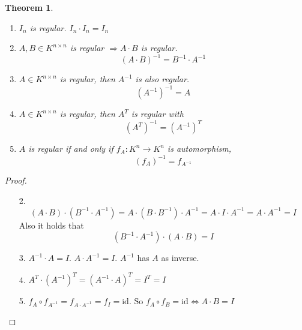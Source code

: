 \documentclass[a4paper,landscape,twocolumn]{article}
\newtheorem{theorem}{Theorem}
\begin{document}
\begin{theorem}
  \label{theorem-6.14}
  \begin{enumerate}
    \item $I_n$ is regular. $I_n \cdot I_n = I_n$
    \item $A, B \in K^{n\times n}$ is regular $\Rightarrow A \cdot B$ is regular.
      \[ \left(A \cdot B\right)^{-1} = B^{-1} \cdot A^{-1} \]
    \item $A \in K^{n\times n}$ is regular, then $A^{-1}$ is also regular.
      \[ \left(A^{-1}\right)^{-1} = A \]
    \item $A \in K^{n\times n}$ is regular, then $A^T$ is regular with
      \[ \left(A^T\right)^{-1} = \left(A^{-1}\right)^T \]
    \item $A$ is regular if and only if $f_A: K^n \to K^n$ is automorphism,
      \[ \left(f_A\right)^{-1} = f_{A^{-1}} \]
  \end{enumerate}
\end{theorem}
\begin{proof}
  \begin{enumerate}
    \item[2.] \[
        (A \cdot B) \cdot (B^{-1} \cdot A^{-1})
        = A \cdot (B \cdot B^{-1}) \cdot A^{-1}
        = A \cdot I \cdot A^{-1}
        = A \cdot A^{-1}
        = I
      \]
      Also it holds that
      \[ (B^{-1} \cdot A^{-1}) \cdot (A \cdot B) = I \]
    \item[3.] $A^{-1} \cdot A = I$. $A \cdot A^{-1} = I$.
      $A^{-1}$ has $A$ as inverse.
    \item[4.] $A^T \cdot (A^{-1})^T = \left(A^{-1} \cdot A\right)^T = I^T = I$
    \item[5.] $f_A \circ f_{A^{-1}} = f_{A \cdot A^{-1}} = f_I = \text{id}$.
      So $f_A \circ f_B = \text{id} \Leftrightarrow A \cdot B = I$
  \end{enumerate}
\end{proof}
\end{document}

